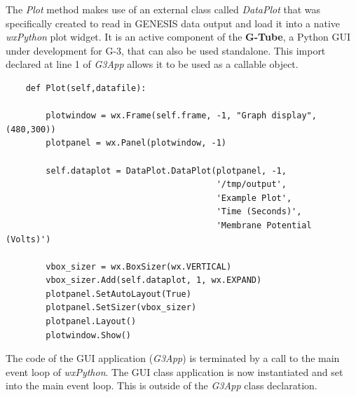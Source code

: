 \documentclass[12pt]{article}
\begin{document}
The {\it Plot} method makes use of an external class called {\it DataPlot} that
was specifically created to read in GENESIS data output and load 
it into a native {\it wxPython} plot widget. It is an active component of
the {\bf G-Tube}, a Python GUI under development for G-3, that can 
also be used standalone. This import declared at line 1 of {\it G3App} allows it to be used as a callable object. 

{\footnotesize
  \linenumbers
\begin{verbatim} 
    def Plot(self,datafile):

        plotwindow = wx.Frame(self.frame, -1, "Graph display", (480,300))
        plotpanel = wx.Panel(plotwindow, -1)

        self.dataplot = DataPlot.DataPlot(plotpanel, -1,
                                          '/tmp/output',
                                          'Example Plot',
                                          'Time (Seconds)',
                                          'Membrane Potential (Volts)')

        vbox_sizer = wx.BoxSizer(wx.VERTICAL)
        vbox_sizer.Add(self.dataplot, 1, wx.EXPAND)
        plotpanel.SetAutoLayout(True)
        plotpanel.SetSizer(vbox_sizer)
        plotpanel.Layout()
        plotwindow.Show()
\end{verbatim}
}


    

The code of the GUI application ({\it G3App}) is terminated by a call to the main
event loop of {\it wxPython}.  The GUI class application is now instantiated and set
into the main event loop. This is outside of the {\it G3App} class
declaration.

\end{document}
